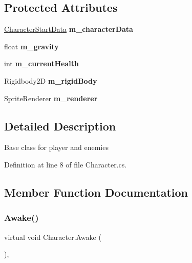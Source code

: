 \subsection*{Protected Attributes}
\begin{DoxyCompactItemize}
\item 
\mbox{\label{class_character_ae6f38ea3ad77f6aeba55631d8a47f089}} 
\mbox{\hyperlink{struct_character_start_data}{Character\+Start\+Data}} {\bfseries m\+\_\+character\+Data}
\item 
\mbox{\label{class_character_a0049d5b1f387150dbe1086086fcaea4c}} 
float {\bfseries m\+\_\+gravity}
\item 
\mbox{\label{class_character_a694ba48446eed2ff9ce2354f83f2072c}} 
int {\bfseries m\+\_\+current\+Health}
\item 
\mbox{\label{class_character_a98899aa78f445adc994fb39a50f37fc4}} 
Rigidbody2D {\bfseries m\+\_\+rigid\+Body}
\item 
\mbox{\label{class_character_a3522770974fe60235263b7050b30e1c8}} 
Sprite\+Renderer {\bfseries m\+\_\+renderer}
\end{DoxyCompactItemize}


\subsection{Detailed Description}
Base class for player and enemies 



Definition at line 8 of file Character.\+cs.



\subsection{Member Function Documentation}
\mbox{\label{class_character_a7cca5d1f141f2f46a1d087fd3e28a953}} 
\subsubsection{\texorpdfstring{Awake()}{Awake()}}
{\footnotesize\ttfamily virtual void Character.\+Awake (\begin{DoxyParamCaption}{ }\end{DoxyParamCaption})\hspace{0.3cm}{\ttfamily [protected]}, {\ttfamily [virtual]}}




